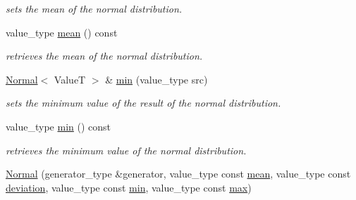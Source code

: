 \begin{DoxyCompactItemize}
\begin{DoxyCompactList}\small\item\em sets the mean of the normal distribution. \end{DoxyCompactList}\item 
\hypertarget{classhryky_1_1random_1_1distribution_1_1_normal_a86f67e310d370107dcf2cd69f6d186e2}{value\-\_\-type \hyperlink{classhryky_1_1random_1_1distribution_1_1_normal_a86f67e310d370107dcf2cd69f6d186e2}{mean} () const }\label{classhryky_1_1random_1_1distribution_1_1_normal_a86f67e310d370107dcf2cd69f6d186e2}

\begin{DoxyCompactList}\small\item\em retrieves the mean of the normal distribution. \end{DoxyCompactList}\item 
\hypertarget{classhryky_1_1random_1_1distribution_1_1_normal_a133dc9d1669f90c4a9d55fca3b7be4b3}{\hyperlink{classhryky_1_1random_1_1distribution_1_1_normal}{Normal}$<$ Value\-T $>$ \& \hyperlink{classhryky_1_1random_1_1distribution_1_1_normal_a133dc9d1669f90c4a9d55fca3b7be4b3}{min} (value\-\_\-type src)}\label{classhryky_1_1random_1_1distribution_1_1_normal_a133dc9d1669f90c4a9d55fca3b7be4b3}

\begin{DoxyCompactList}\small\item\em sets the minimum value of the result of the normal distribution. \end{DoxyCompactList}\item 
\hypertarget{classhryky_1_1random_1_1distribution_1_1_normal_af92151f38ce442d84bd477fbaf1f71c1}{value\-\_\-type \hyperlink{classhryky_1_1random_1_1distribution_1_1_normal_af92151f38ce442d84bd477fbaf1f71c1}{min} () const }\label{classhryky_1_1random_1_1distribution_1_1_normal_af92151f38ce442d84bd477fbaf1f71c1}

\begin{DoxyCompactList}\small\item\em retrieves the minimum value of the normal distribution. \end{DoxyCompactList}\item 
\hypertarget{classhryky_1_1random_1_1distribution_1_1_normal_a5fc939a1ad84bf2f51904a0df2463dbe}{\hyperlink{classhryky_1_1random_1_1distribution_1_1_normal_a5fc939a1ad84bf2f51904a0df2463dbe}{Normal} (generator\-\_\-type \&generator, value\-\_\-type const \hyperlink{classhryky_1_1random_1_1distribution_1_1_normal_acc11e24dbfb6d8250aea4400e84e7d5a}{mean}, value\-\_\-type const \hyperlink{classhryky_1_1random_1_1distribution_1_1_normal_a421514c36ee40e90a9de30917ca6af08}{deviation}, value\-\_\-type const \hyperlink{classhryky_1_1random_1_1distribution_1_1_normal_a133dc9d1669f90c4a9d55fca3b7be4b3}{min}, value\-\_\-type const \hyperlink{classhryky_1_1random_1_1distribution_1_1_normal_aef11b7363a00e38dee7a7a751af8666f}{max})}\label{classhryky_1_1random_1_1distribution_1_1_normal_a5fc939a1ad84bf2f51904a0df2463dbe}


\end{DoxyCompactItemize}

